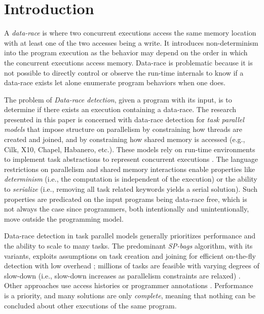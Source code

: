 \section{Introduction}
A \emph{data-race} is where two concurrent executions access the same memory location with at least one of the two accesses being a write. It introduces non-determinism into the program execution as the behavior may depend on the order in which the concurrent executions access memory. Data-race is problematic because it is not possible to directly control or observe the run-time internals to know if a data-race exists let alone enumerate program behaviors when one does.

The problem of \emph{Data-race detection}, given a program with its input, is to determine if there exists an execution containing a data-race. The research presented in this paper is concerned with data-race detection for \emph{task parallel models} that impose structure on parallelism by constraining how threads are created and joined, and by constraining how shared memory is accessed (e.g., Cilk, X10, Chapel, Habanero, etc.). These models rely on run-time environments to implement task abstractions to represent concurrent executions \cite{blumofe1996cilk,charles2005x10,cave2011habanero,imam2014habanero}. The language restrictions on parallelism and shared memory interactions enable properties like \emph{determinism} (i.e., the computation is independent of the execution) or the ability to \emph{serialize} (i.e., removing all task related keywords yields a serial solution). Such properties are predicated on the input programs being data-race free, which is not always the case since programmers, both intentionally and unintentionally, move outside the programming model.


Data-race detection in task parallel models generally prioritizes performance and the ability to scale to many tasks. The predominant \emph{SP-bags} algorithm, with its variants, exploits assumptions on task creation and joining for efficient on-the-fly detection with low overhead \cite{Feng1997EDD258492258493,Cheng1998DDR277651277696,Bender2004OMS10079121007933,Async-Finish-Race,Utterback2016PGP29357642935801}; millions of tasks are feasible with varying degrees of slow-down (i.e., slow-down increases as parallelism constraints are relaxed) \cite{drdForFutures,Surendran2016}. Other approaches use access histories \cite{mellor1991fly,raman2012scalable} or programmer annotations \cite{westbrook2012practical, westbrook2012permission}.
Performance is a priority, and many solutions are only \emph{complete}, meaning that nothing can be concluded about other executions of the same program.

